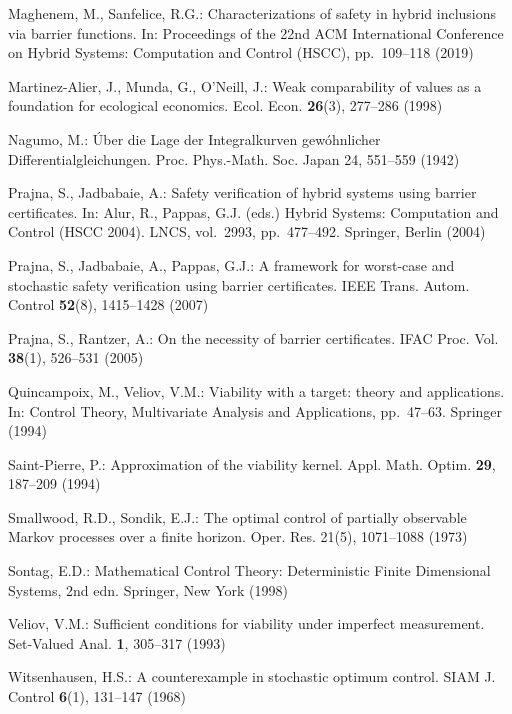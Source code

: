 \documentclass[11pt]{article}
\theoremstyle{definition}
\begin{document}
Maghenem, M., Sanfelice, R.G.: Characterizations of safety in hybrid
inclusions via barrier functions. In: Proceedings of the 22nd ACM
International Conference on Hybrid Systems: Computation and Control
(HSCC), pp.~109--118 (2019)

Martinez-Alier, J., Munda, G., O'Neill, J.: Weak comparability of values
as a foundation for ecological economics. Ecol. Econ. \textbf{26}(3),
277--286 (1998)

Nagumo, M.: \'Uber die Lage der Integralkurven gew\'ohnlicher
Differentialgleichungen. Proc. Phys.-Math. Soc. Japan 24, 551--559
(1942)

Prajna, S., Jadbabaie, A.: Safety verification of hybrid systems using
barrier certificates. In: Alur, R., Pappas, G.J. (eds.) Hybrid Systems:
Computation and Control (HSCC 2004). LNCS, vol.~2993, pp.~477--492.
Springer, Berlin (2004)

Prajna, S., Jadbabaie, A., Pappas, G.J.: A framework for worst-case and
stochastic safety verification using barrier certificates. IEEE Trans.
Autom. Control \textbf{52}(8), 1415--1428 (2007)

Prajna, S., Rantzer, A.: On the necessity of barrier certificates. IFAC
Proc. Vol. \textbf{38}(1), 526--531 (2005)

Quincampoix, M., Veliov, V.M.: Viability with a target: theory and
applications. In: Control Theory, Multivariate Analysis and
Applications, pp.~47--63. Springer (1994)

Saint-Pierre, P.: Approximation of the viability kernel. Appl. Math.
Optim. \textbf{29}, 187--209 (1994)

Smallwood, R.D., Sondik, E.J.: The optimal control of partially
observable Markov processes over a finite horizon. Oper. Res. 21(5),
1071--1088 (1973)

Sontag, E.D.: Mathematical Control Theory: Deterministic Finite Dimensional Systems, 2nd edn. Springer, New York (1998)

Veliov, V.M.: Sufficient conditions for viability under imperfect
measurement. Set-Valued Anal. \textbf{1}, 305--317 (1993)

Witsenhausen, H.S.: A counterexample in stochastic optimum control.
SIAM J. Control \textbf{6}(1), 131--147 (1968)
\end{document}
